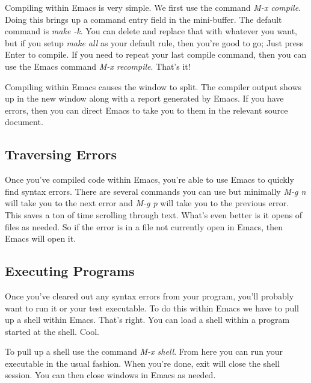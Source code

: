 \documentclass[]{tufte-handout}
\begin{document}
Compiling within Emacs is very simple. We first use the command \textit{M-x compile}. Doing this brings up a command entry field in the mini-buffer. The default command is \textit{make -k}.  You can delete and replace that with whatever you want, but if you setup \textit{make all} as your default rule, then you're good to go; Just press Enter to compile.  If you need to repeat your last compile command, then you can use the Emacs command \textit{M-x recompile}. That's it!

Compiling within Emacs causes the window to split. The compiler output shows up in the new window along with a report generated by Emacs.  If you have errors, then you can direct Emacs to take you to them in the relevant source document.   

\subsection{Traversing Errors}

Once you've compiled code within Emacs, you're able to use Emacs to quickly find syntax errors.  There are several commands you can use but minimally \textit{M-g n} will take you to the next error and \textit{M-g p} will take you to the previous error.  This saves a ton of time scrolling through text. What's even better is it opens of files as needed. So if the error is in a file not currently open in Emacs, then Emacs will open it. 

\subsection{Executing Programs}

Once you've cleared out any syntax errors from your program, you'll probably want to run it or your test executable. To do this within Emacs we have to pull up a shell within Emacs. That's right. You can load a shell within a program started at the shell.  Cool. 

To pull up a shell use the command \textit{M-x shell}. From here you can run your executable in the usual fashion. When you're done, exit will close the shell session.  You can then close windows in Emacs as needed.
\end{document}
